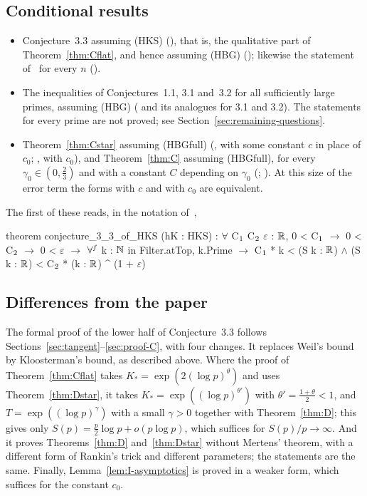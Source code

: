 \subsection*{Conditional results}
\begin{itemize}[leftmargin=*]
\item Conjecture~3.3 assuming (HKS) (), that is, the qualitative part of Theorem~\ref{thm:Cflat}, and hence assuming (HBG) (); likewise the statement  of~\cite{b11} for every $n$ ().
\item The inequalities of Conjectures~1.1, 3.1 and~3.2 for all sufficiently large primes, assuming (HBG) ( and its analogues for 3.1 and 3.2). The statements for every prime are not proved; see Section~\ref{sec:remaining-questions}.
\item Theorem~\ref{thm:Cstar} assuming (HBGfull) (, with some constant $c$ in place of $c_0$; , with $c_0$), and Theorem~\ref{thm:C} assuming (HBGfull), for every $\gamma_0\in(0,\frac23)$ and with a constant $C$ depending on $\gamma_0$ (; ). At this size of the error term the forms with $c$ and with $c_0$ are equivalent.
\end{itemize}
The first of these reads, in the notation of~\cite{b11},
\begin{leancode}
theorem conjecture_3_3_of_HKS (hK : HKS) :
    $\forall$ C$\sb{1}$ C$\sb{2}$ $\varepsilon$ : $\mathbb{R}$, 0 < C$\sb{1}$ $\to$ 0 < C$\sb{2}$ $\to$ 0 < $\varepsilon$ $\to$
    $\forall\sp{f}$ k : $\mathbb{N}$ in Filter.atTop, k.Prime $\to$
      C$\sb{1}$ * k < (S k : $\mathbb{R}$) $\wedge$ (S k : $\mathbb{R}$) < C$\sb{2}$ * (k : $\mathbb{R}$) ^ (1 + $\varepsilon$)
\end{leancode}

\subsection*{Differences from the paper}
The formal proof of the lower half of Conjecture~3.3 follows Sections~\ref{sec:tangent}--\ref{sec:proof-C}, with four changes. It replaces Weil's bound by Kloosterman's bound, as described above. Where the proof of Theorem~\ref{thm:Cflat} takes $K_*=\exp(2(\log p)^\theta)$ and uses Theorem~\ref{thm:Dstar}, it takes $K_*=\exp((\log p)^{\theta'})$ with $\theta'=\frac{1+\theta}2<1$, and $T=\exp((\log p)^{\gamma})$ with a small $\gamma>0$ together with Theorem~\ref{thm:D}; this gives only $S(p)=\frac p2\log p+o(p\log p)$, which suffices for $S(p)/p\to\infty$. And it proves Theorems~\ref{thm:D} and~\ref{thm:Dstar} without Mertens' theorem, with a different form of Rankin's trick and different parameters; the statements are the same. Finally, Lemma~\ref{lem:I-asymptotics} is proved in a weaker form, which suffices for the constant $c_0$.

